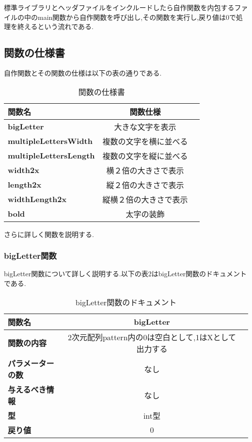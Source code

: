 \documentclass[uplatex,dvipdfmx]{jsarticle}
\begin{document}
標準ライブラリとヘッダファイルをインクルードしたら自作関数を内包するファイルの中のmain関数から自作関数を呼び出し,その関数を実行し,戻り値は0で処理を終えるという流れである.

\subsection{関数の仕様書}
自作関数とその関数の仕様は以下の表の通りである.
\newpage

\begin{table}[h]
    \centering
    \caption{関数の仕様書}
    \begin{tabular}{@{}lcc@{}}
    \toprule
    \textbf{関数名}         & \textbf{関数仕様}                                        \\ \midrule
    \textbf{bigLetter}                & 大きな文字を表示   \\ 
    \textbf{multipleLettersWidth}               &     複数の文字を横に並べる                                \\ 
    \textbf{multipleLettersLength}             &      複数の文字を縦に並べる                        \\ 
    \textbf{width2x}                &     横２倍の大きさで表示                     \\ 
    \textbf{length2x}                & 縦２倍の大きさで表示                              \\ 
    \textbf{widthLength2x}                & 縦横２倍の大きさで表示                             \\ 
    \textbf{bold}                & 太字の装飾                          \\ \bottomrule
  \end{tabular}
\end{table}

さらに詳しく関数を説明する.

\subsubsection{bigLetter関数}
bigLetter関数について詳しく説明する.以下の表2はbigLetter関数のドキュメントである.
\begin{table}[h]
    \centering
    \caption{bigLetter関数のドキュメント}
    \begin{tabular}{@{}lcc@{}}
    \toprule
    \textbf{関数名}         & \textbf{bigLetter}                                        \\ \midrule
    \textbf{関数の内容}                & 2次元配列pattern内の0は空白として,1はXとして出力する\\ 
    \textbf{パラメーターの数}               &     なし                                \\ 
    \textbf{与えるべき情報}             &     なし                        \\ 
    \textbf{型}                &     int型                    \\ 
    \textbf{戻り値}                & 0                              \\ \bottomrule
  \end{tabular}
\end{table}
\end{document}
